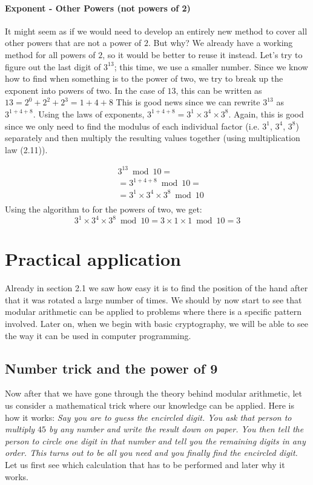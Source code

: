 \paragraph{Exponent - Other Powers (not powers of 2)}
It might seem as if we would need to develop an entirely new method to cover all other powers that are not a power of $2$. But why? We already have a working method for all powers of $2$, so it would be better to reuse it instead. Let's try to figure out the last digit of $3^{13}$; this time, we use a smaller number. Since we know how to find when something is to the power of two, we try to break up the exponent into powers of two. In the case of $13$, this can be written as $13=2^0+2^2+2^3=1+4+8$  This is good news since we can rewrite $3^{13}$ as $3^{1+4+8}$. Using the laws of exponents, $3^{1+4+8}=3^1 \times 3^4 \times 3^8$. Again, this is good since we only need to find the modulus of each individual factor (i.e. $3^1$, $3^4$, $3^8$) separately and then multiply the resulting values together (using multiplication law (2.11)).

\begin{align*}
& 3^{13} \bmod 10 =\\ &=  3^{1+4+8} \bmod 10 =\\ &= 3^1\times3^4\times3^8 \bmod 10 \\
\end{align*}
Using the algorithm to for the powers of two, we get:
\begin{equation*}
 3^1\times3^4\times3^8 \bmod 10 = 3\times 1 \times 1 \bmod 10 = 3
\end{equation*}



\section{Practical application}
Already in section 2.1 we saw how easy it is to find the position of the hand after that it was rotated a large number of times. We should by now start to see that modular arithmetic can be applied to problems where there is a specific pattern involved. Later on, when we begin with basic cryptography, we will be able to see the way it can be used in computer programming.

\subsection{Number trick and the power of 9}
Now after that we have gone through the theory behind modular arithmetic, let us consider a mathematical trick where our knowledge can be applied. Here is how it works:
\textit{Say you are to guess the encircled digit. You ask that person to multiply $45$ by any number and write the result down on paper. You then tell the person to circle one digit in that number and tell you the remaining digits in any order. This turns out to be all you need and you finally find the encircled digit.} Let us first see which calculation that has to be performed and later why it works.

